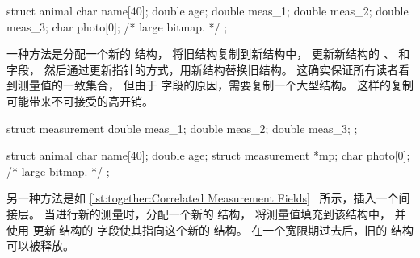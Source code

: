 \begin{listing}
\begin{VerbatimL}[tabsize=8]
struct animal {
	char name[40];
	double age;
	double meas_1;
	double meas_2;
	double meas_3;
	char photo[0]; /* large bitmap. */
};
\end{VerbatimL}
\caption{非关联的测量字段}
\label{lst:together:Uncorrelated Measurement Fields}
\end{listing}

一种方法是分配一个新的  结构，
将旧结构复制到新结构中，
更新新结构的 、 和  字段，
然后通过更新指针的方式，用新结构替换旧结构。
这确实保证所有读者看到测量值的一致集合，
但由于  字段的原因，需要复制一个大型结构。
这样的复制可能带来不可接受的高开销。

\begin{listing}
\begin{VerbatimL}[tabsize=8]
struct measurement {
	double meas_1;
	double meas_2;
	double meas_3;
};

struct animal {
	char name[40];
	double age;
	struct measurement *mp;
	char photo[0]; /* large bitmap. */
};
\end{VerbatimL}
\caption{关联的测量字段}
\label{lst:together:Correlated Measurement Fields}
\end{listing}

另一种方法是如
\cref{lst:together:Correlated Measurement Fields}~\cite[Section 5.3.4]{PaulEdwardMcKenneyPhD}
所示，插入一个间接层。
当进行新的测量时，分配一个新的  结构，
将测量值填充到该结构中，
并使用 
更新  结构的  字段使其指向这个新的
 结构。
在一个宽限期过去后，旧的  结构可以被释放。

